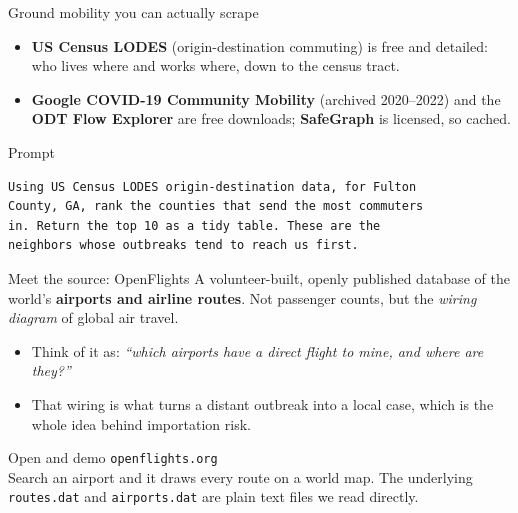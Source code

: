 \documentclass[aspectratio=169,11pt]{beamer}
\begin{document}
\begin{frame}[fragile]{Ground mobility you can actually scrape}
  \begin{itemize}
    \item \textbf{US Census LODES} (origin-destination commuting) is free and detailed: who
          lives where and works where, down to the census tract.
    \item \textbf{Google COVID-19 Community Mobility} (archived 2020--2022) and the \textbf{ODT
          Flow Explorer} are free downloads; \textbf{SafeGraph} is licensed, so cached.
  \end{itemize}
  \begin{block}{Prompt}
  \begin{lstlisting}
Using US Census LODES origin-destination data, for Fulton
County, GA, rank the counties that send the most commuters
in. Return the top 10 as a tidy table. These are the
neighbors whose outbreaks tend to reach us first.
  \end{lstlisting}
  \end{block}
\end{frame}

\begin{frame}{Meet the source: OpenFlights}
  A volunteer-built, openly published database of the world's \textbf{airports and airline
  routes}. Not passenger counts, but the \emph{wiring diagram} of global air travel.
  \begin{itemize}
    \item Think of it as: \emph{``which airports have a direct flight to mine, and where are
          they?''}
    \item That wiring is what turns a distant outbreak into a local case, which is the whole
          idea behind importation risk.
  \end{itemize}
  \begin{exampleblock}{Open and demo}
    \texttt{openflights.org} \\
    Search an airport and it draws every route on a world map. The underlying
    \texttt{routes.dat} and \texttt{airports.dat} are plain text files we read directly.
  \end{exampleblock}
\end{frame}
\end{document}
